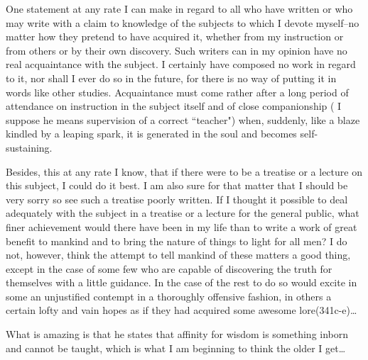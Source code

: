 \begin{footnotesize}
\begin{sffamily}
One statement at any rate I can make in regard to all who have written or who may write with a claim to knowledge of the
subjects to which I devote myself–no matter how they pretend to have acquired it, whether from my instruction or from
others or by their own discovery. Such writers can in my opinion have no real acquaintance with the subject. I
certainly have composed no work in regard to it, nor shall I ever do so in the future, for there is no way of putting
it in words like other studies. Acquaintance must come rather after a long period of attendance on instruction in the
subject itself and of close companionship ( I suppose he means supervision of a correct ``teacher") when, suddenly, like
a blaze kindled by a leaping spark, it is generated in the soul and becomes self-sustaining.

Besides, this at any rate I know, that if there were to be a treatise or a lecture on this subject, I could do it best.
I am also sure for that matter that I should be very sorry so see such a treatise poorly written. If I thought it
possible to deal adequately with the subject in a treatise or a lecture for the general public, what finer achievement
would there have been in my life than to write a work of great benefit to mankind and to bring the nature of things to
light for all men? I do not, however, think the attempt to tell mankind of these matters a good thing, except in the
case of some few who are capable of discovering the truth for themselves with a little guidance. In the case of the
rest to do so would excite in some an unjustified contempt in a thoroughly offensive fashion, in others a certain lofty
and vain hopes as if they had acquired some awesome lore(341c-e)…

What is amazing is that he states that affinity for wisdom is something inborn and cannot be taught, which is what I am
beginning to think the older I get…


\end{sffamily}
\end{footnotesize}
